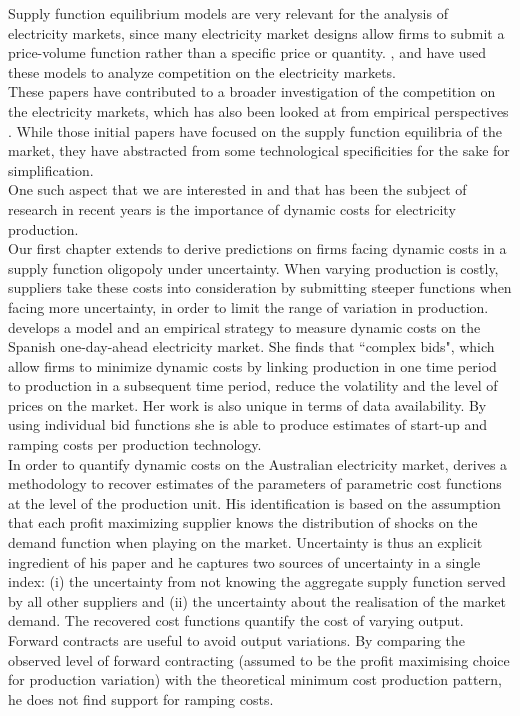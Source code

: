 Supply function equilibrium models are very relevant for the analysis of electricity markets, since many electricity market designs allow firms to submit a price-volume function rather than a specific price or quantity. \cite{Newgreen}, \cite{newbery1998competition} and \cite{bolle1992supply} have used these models to analyze competition on the electricity markets. \\

These papers have contributed to a broader investigation of the competition on the electricity markets, which has also been looked at from empirical perspectives \cite{wolfram1998strategic, borensteinetal2002marketineffs}.
While those initial papers have focused on the supply function equilibria of the market, they have abstracted from some technological specificities for the sake for simplification. \\

One such aspect that we are interested in and that has been the subject of research in recent years is the importance of dynamic costs for electricity production. \\
Our first chapter extends \cite{KM} to derive predictions on firms facing dynamic costs in a supply function oligopoly under uncertainty. 
When varying production is costly, suppliers take these costs into consideration by submitting steeper functions when facing more uncertainty, in order to limit the range of variation in production.
\cite{reguant2011welfare} develops a model and an empirical strategy to measure dynamic costs on the Spanish one-day-ahead electricity market. She finds that ``complex bids", which allow firms to minimize dynamic costs by linking production in one time period to production in a subsequent time period, reduce the volatility and the level of prices on the market.  Her work is also unique in terms of data availability. By using individual bid functions she is able to produce estimates of start-up and ramping costs per production technology. \\

In order to quantify dynamic costs on the Australian electricity market, \cite{wolak2007quantifying} derives a methodology to recover estimates of the parameters of parametric cost functions at the level of the production unit. His identification is based on the assumption that each profit maximizing supplier knows the distribution of shocks on the demand function when playing on the market. Uncertainty is thus an explicit ingredient of his paper and he captures two sources of uncertainty in a single index: (i) the uncertainty from not knowing the aggregate supply function served by all other suppliers and (ii) the uncertainty about the realisation of the market demand.  The recovered cost functions quantify the cost of varying output. Forward contracts are useful to avoid output variations. By comparing the observed  level of forward contracting (assumed to be the profit maximising choice for production variation) with the theoretical minimum cost production pattern, he %
does not find support for ramping costs.\\

